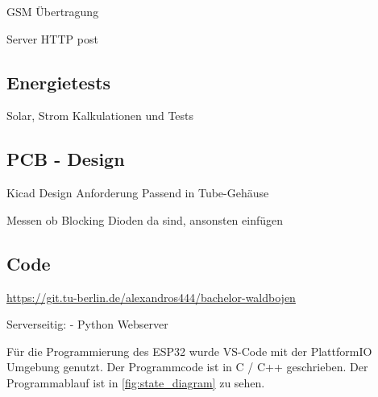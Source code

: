 GSM Übertragung

Server HTTP post

\subsection{Energietests}

Solar, Strom Kalkulationen und Tests

\subsection{PCB - Design}
Kicad
Design Anforderung Passend in Tube-Gehäuse


Messen ob Blocking Dioden da sind, ansonsten einfügen


\subsection{Code}
\url{https://git.tu-berlin.de/alexandros444/bachelor-waldbojen}

Serverseitig:
- Python Webserver

Für die Programmierung des ESP32 wurde VS-Code mit der PlattformIO Umgebung genutzt.
Der Programmcode ist in C / C++ geschrieben.
Der Programmablauf ist in \ref{fig:state_diagram}  zu sehen.



